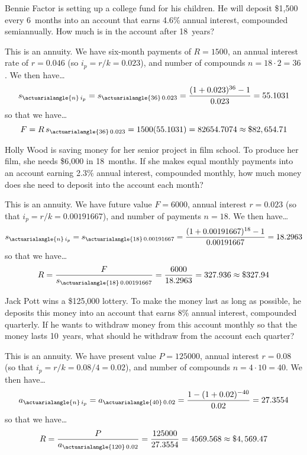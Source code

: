 \documentclass[11pt,letterpaper]{article}
\begin{document}

 Bennie Factor is setting up a college fund for his children. He will deposit \$1,500 every 6~months into an account that earns 4.6\% annual interest, compounded semiannually. How much is in the account after 18~years? \pspace

\sol This is an annuity. We have six-month payments of $R= 1500$, an annual interest rate of $r= 0.046$ (so $i_p= r/k= 0.023$), and number of compounds $n= 18 \cdot 2= 36$. We then have\dots
	\[
	s_{\actuarialangle{n}\,i_p}= s_{\actuarialangle{36}\,0.023}= \dfrac{(1 + 0.023)^{36} - 1}{0.023}= 55.1031
	\]
so that we have\dots
	\[
	F= R\, s_{\actuarialangle{36}\,0.023}= 1500 (55.1031)= 82654.7074 \approx \$82,654.71
	\]



\newpage



 Holly Wood is saving money for her senior project in film school. To produce her film, she needs \$6,000 in 18~months. If she makes equal monthly payments into an account earning 2.3\% annual interest, compounded monthly, how much money does she need to deposit into the account each month? \pspace

\sol This is an annuity. We have future value $F= 6000$, annual interest $r= 0.023$ (so that $i_p= r/k= 0.00191667$), and number of payments $n= 18$. We then have\dots
	\[
	s_{\actuarialangle{n}\,i_p}= s_{\actuarialangle{18}\,0.00191667}= \dfrac{(1 + 0.00191667)^{18} - 1}{0.00191667}= 18.2963
	\]
so that we have\dots
	\[
	R= \dfrac{F}{s_{\actuarialangle{18}\,0.00191667}}= \dfrac{6000}{18.2963}= 327.936 \approx \$327.94
	\]



\newpage



 Jack Pott wins a \$125,000 lottery. To make the money last as long as possible, he deposits this money into an account that earns 8\% annual interest, compounded quarterly. If he wants to withdraw money from this account monthly so that the money lasts 10~years, what should he withdraw from the account each quarter? \pspace

\sol This is an annuity. We have present value $P= 125000$, annual interest $r= 0.08$ (so that $i_p= r/k= 0.08/4= 0.02$), and number of compounds $n= 4 \cdot 10= 40$. We then have\dots
	\[
	a_{\actuarialangle{n}\,i_p}= a_{\actuarialangle{40}\,0.02}= \dfrac{1 - (1 + 0.02)^{-40}}{0.02}= 27.3554
	\]
so that we have\dots
	\[
	R= \dfrac{P}{a_{\actuarialangle{120}\,0.02}}= \dfrac{125000}{27.3554}= 4569.568 \approx \$4,569.47
	\]
\end{document}
